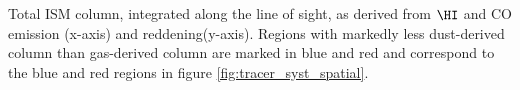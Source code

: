 \label{fig:tracer_syst_values}

Total ISM column, integrated along the line of sight, as derived from $\HI$ and CO emission (x-axis) and reddening(y-axis). Regions with markedly less dust-derived column than gas-derived column are marked in blue and red and correspond to the blue and red regions in figure \ref{fig:tracer_syst_spatial}.